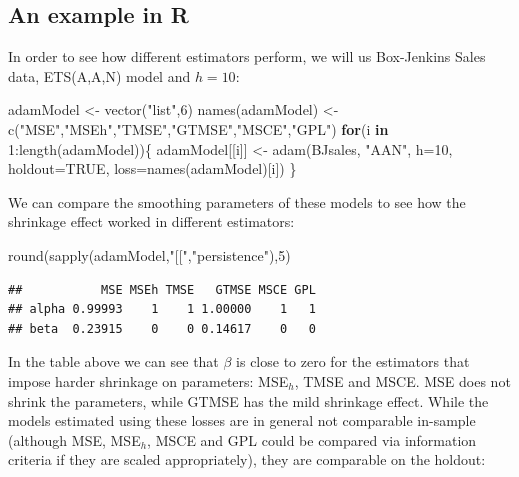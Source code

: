 \documentclass[
]{book}
\newenvironment{Shaded}{\begin{snugshade}}{\end{snugshade}}
\newcommand{\AttributeTok}[1]{\textcolor[rgb]{0.77,0.63,0.00}{#1}}
\newcommand{\ConstantTok}[1]{\textcolor[rgb]{0.00,0.00,0.00}{#1}}
\newcommand{\ControlFlowTok}[1]{\textcolor[rgb]{0.13,0.29,0.53}{\textbf{#1}}}
\newcommand{\DecValTok}[1]{\textcolor[rgb]{0.00,0.00,0.81}{#1}}
\newcommand{\FunctionTok}[1]{\textcolor[rgb]{0.00,0.00,0.00}{#1}}
\newcommand{\NormalTok}[1]{#1}
\newcommand{\OtherTok}[1]{\textcolor[rgb]{0.56,0.35,0.01}{#1}}
\newcommand{\SpecialCharTok}[1]{\textcolor[rgb]{0.00,0.00,0.00}{#1}}
\newcommand{\StringTok}[1]{\textcolor[rgb]{0.31,0.60,0.02}{#1}}
\theoremstyle{definition}
\theoremstyle{definition}
\theoremstyle{definition}
\theoremstyle{definition}
\theoremstyle{remark}
\begin{document}
\hypertarget{an-example-in-r-1}{%
\subsection{An example in R}\label{an-example-in-r-1}}

In order to see how different estimators perform, we will us Box-Jenkins Sales data, ETS(A,A,N) model and \(h=10\):

\begin{Shaded}
\begin{Highlighting}[]
\NormalTok{adamModel }\OtherTok{\textless{}{-}} \FunctionTok{vector}\NormalTok{(}\StringTok{"list"}\NormalTok{,}\DecValTok{6}\NormalTok{)}
\FunctionTok{names}\NormalTok{(adamModel) }\OtherTok{\textless{}{-}} \FunctionTok{c}\NormalTok{(}\StringTok{"MSE"}\NormalTok{,}\StringTok{"MSEh"}\NormalTok{,}\StringTok{"TMSE"}\NormalTok{,}\StringTok{"GTMSE"}\NormalTok{,}\StringTok{"MSCE"}\NormalTok{,}\StringTok{"GPL"}\NormalTok{)}
\ControlFlowTok{for}\NormalTok{(i }\ControlFlowTok{in} \DecValTok{1}\SpecialCharTok{:}\FunctionTok{length}\NormalTok{(adamModel))\{}
\NormalTok{  adamModel[[i]] }\OtherTok{\textless{}{-}} \FunctionTok{adam}\NormalTok{(BJsales, }\StringTok{"AAN"}\NormalTok{, }\AttributeTok{h=}\DecValTok{10}\NormalTok{, }\AttributeTok{holdout=}\ConstantTok{TRUE}\NormalTok{,}
                         \AttributeTok{loss=}\FunctionTok{names}\NormalTok{(adamModel)[i])}
\NormalTok{\}}
\end{Highlighting}
\end{Shaded}

We can compare the smoothing parameters of these models to see how the shrinkage effect worked in different estimators:

\begin{Shaded}
\begin{Highlighting}[]
\FunctionTok{round}\NormalTok{(}\FunctionTok{sapply}\NormalTok{(adamModel,}\StringTok{"[["}\NormalTok{,}\StringTok{"persistence"}\NormalTok{),}\DecValTok{5}\NormalTok{)}
\end{Highlighting}
\end{Shaded}

\begin{verbatim}
##           MSE MSEh TMSE   GTMSE MSCE GPL
## alpha 0.99993    1    1 1.00000    1   1
## beta  0.23915    0    0 0.14617    0   0
\end{verbatim}

In the table above we can see that \(\beta\) is close to zero for the estimators that impose harder shrinkage on parameters: MSE\(_h\), TMSE and MSCE. MSE does not shrink the parameters, while GTMSE has the mild shrinkage effect. While the models estimated using these losses are in general not comparable in-sample (although MSE, MSE\(_h\), MSCE and GPL could be compared via information criteria if they are scaled appropriately), they are comparable on the holdout:
\end{document}

